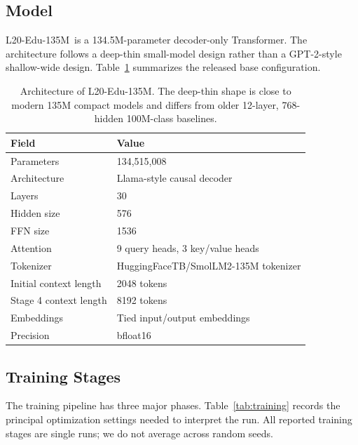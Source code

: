 \documentclass[11pt]{article}
\newcommand{\model}{L20-Edu-135M}
\begin{document}
\subsection{Model}

\model\ is a 134.5M-parameter decoder-only Transformer. The architecture follows a deep-thin small-model design rather than a GPT-2-style shallow-wide design. Table~\ref{tab:architecture} summarizes the released base configuration.

\begin{table}[h]
\centering
\small
\begin{tabular}{ll}
\toprule
Field & Value \\
\midrule
Parameters & 134,515,008 \\
Architecture & Llama-style causal decoder \\
Layers & 30 \\
Hidden size & 576 \\
FFN size & 1536 \\
Attention & 9 query heads, 3 key/value heads \\
Tokenizer & HuggingFaceTB/SmolLM2-135M tokenizer \\
Initial context length & 2048 tokens \\
Stage 4 context length & 8192 tokens \\
Embeddings & Tied input/output embeddings \\
Precision & bfloat16 \\
\bottomrule
\end{tabular}
\caption{Architecture of \model. The deep-thin shape is close to modern 135M compact models and differs from older 12-layer, 768-hidden 100M-class baselines.}
\label{tab:architecture}
\end{table}

\subsection{Training Stages}

The training pipeline has three major phases. Table~\ref{tab:training} records the principal optimization settings needed to interpret the run. All reported training stages are single runs; we do not average across random seeds.
\end{document}
